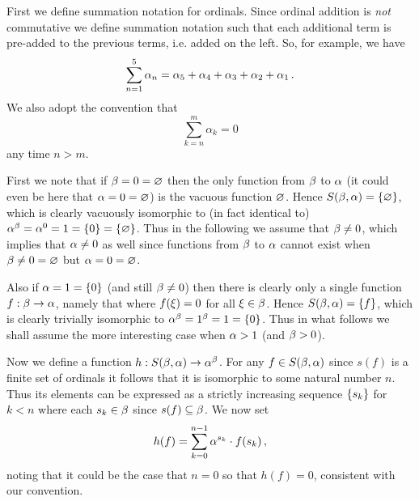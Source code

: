 \def\ex{6.5.16}
\setcounter{itm}{0}
\question{\ex}

\begin{solution}
    First we define summation notation for ordinals.
    Since ordinal addition is \emph{not} commutative we define summation notation such that each additional term is pre-added to the previous terms, i.e. added on the left.
    So, for example, we have
    $$
    \sum_{n = 1}^5 \alpha_n = \alpha_5 + \alpha_4 + \alpha_3 + \alpha_2 + \alpha_1 \,.
    $$
    We also adopt the convention that
    $$
    \sum_{k=n}^m \alpha_k = 0
    $$
    any time $n > m$.

    First we note that if $\beta = 0 = \varnothing$ then the only function from $\beta$ to $\alpha$ (it  could even be here that $\alpha = 0 = \varnothing$) is the vacuous function $\varnothing$.
    Hence $S(\beta, \alpha) = \left\{ \varnothing \right\}$, which is clearly vacuously isomorphic to (in fact identical to) $\alpha^\beta = \alpha^0 = 1 = \left\{ 0 \right\} = \left\{ \varnothing \right\}$.
    Thus in the following we assume that $\beta \neq 0$, which implies that $\alpha \neq 0$ as well since functions from $\beta$ to $\alpha$ cannot exist when $\beta \neq 0 = \varnothing$ but $\alpha = 0 = \varnothing$.

    Also if $\alpha = 1 = \left\{ 0 \right\}$ (and still $\beta \neq 0$) then there is clearly only a single function $f: \beta \to \alpha$, namely that where $f(\xi) = 0$ for all $\xi \in \beta$.
    Hence $S(\beta, \alpha) = \left\{ f \right\}$, which is clearly trivially isomorphic to $\alpha^\beta = 1^\beta = 1 = \left\{ 0 \right\}$.
    Thus in what follows we shall assume the more interesting case when $\alpha > 1$ (and $\beta > 0$).

    Now we define a function $h : S(\beta, \alpha) \to \alpha^\beta$.
    For any $f \in S(\beta, \alpha)$ since $s(f)$ is a finite set of ordinals it follows that it is isomorphic to some natural number $n$.
    Thus its elements can be expressed as a  strictly increasing sequence $\left\{ s_k \right\}$ for $k < n$ where each $s_k \in \beta$ since $s(f) \subseteq \beta$.
    We now set
    $$
    h(f) = \sum_{k=0}^{n-1} \alpha^{s_k} \cdot f(s_k) \,,
    $$
    noting that it could be the case that $n=0$ so that $h(f) = 0$, consistent with our convention.


\end{solution}
